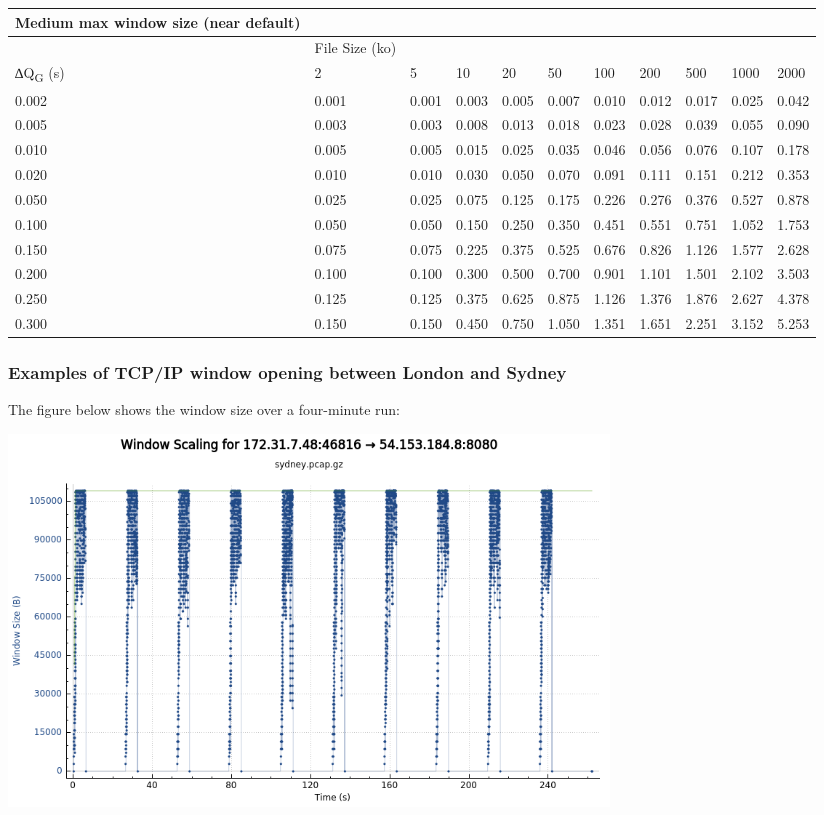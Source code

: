 \documentclass[11pt,a4paper]{article}
\begin{document}
\begin{longtable}[]{@{}lllllllllll@{}}
\toprule
Medium max window size (near default) & & & & & & & & & &\tabularnewline
\midrule
\endhead
& File Size (ko) & & & & & & & & &\tabularnewline
∆Q\textbar{}\textsubscript{G} (s) & 2 & 5 & 10 & 20 & 50 & 100 & 200 &
500 & 1000 & 2000\tabularnewline
0.002 & 0.001 & 0.001 & 0.003 & 0.005 & 0.007 & 0.010 & 0.012 & 0.017 &
0.025 & 0.042\tabularnewline
0.005 & 0.003 & 0.003 & 0.008 & 0.013 & 0.018 & 0.023 & 0.028 & 0.039 &
0.055 & 0.090\tabularnewline
0.010 & 0.005 & 0.005 & 0.015 & 0.025 & 0.035 & 0.046 & 0.056 & 0.076 &
0.107 & 0.178\tabularnewline
0.020 & 0.010 & 0.010 & 0.030 & 0.050 & 0.070 & 0.091 & 0.111 & 0.151 &
0.212 & 0.353\tabularnewline
0.050 & 0.025 & 0.025 & 0.075 & 0.125 & 0.175 & 0.226 & 0.276 & 0.376 &
0.527 & 0.878\tabularnewline
0.100 & 0.050 & 0.050 & 0.150 & 0.250 & 0.350 & 0.451 & 0.551 & 0.751 &
1.052 & 1.753\tabularnewline
0.150 & 0.075 & 0.075 & 0.225 & 0.375 & 0.525 & 0.676 & 0.826 & 1.126 &
1.577 & 2.628\tabularnewline
0.200 & 0.100 & 0.100 & 0.300 & 0.500 & 0.700 & 0.901 & 1.101 & 1.501 &
2.102 & 3.503\tabularnewline
0.250 & 0.125 & 0.125 & 0.375 & 0.625 & 0.875 & 1.126 & 1.376 & 1.876 &
2.627 & 4.378\tabularnewline
0.300 & 0.150 & 0.150 & 0.450 & 0.750 & 1.050 & 1.351 & 1.651 & 2.251 &
3.152 & 5.253\tabularnewline
\bottomrule
\end{longtable}

\subsubsection{Examples of TCP/IP window opening between London and Sydney}
\label{examples-of-tcpip-window-opening-between-london-and-sydney}

The figure below shows the window size over a four-minute run:

\includegraphics[width=6.27083in,height=3.88889in]{./media/image1.png}
\end{document}
